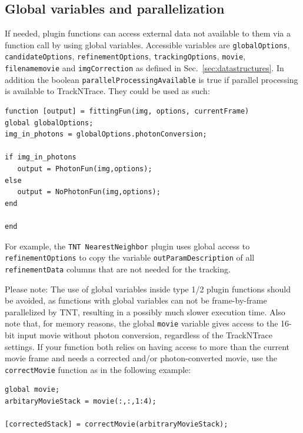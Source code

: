 \documentclass[11pt,onside]{report}
\numberwithin{equation}{chapter}
\begin{document}
\subsection{Global variables and parallelization}
If needed, plugin functions can access external data not available to them via a function call by using global variables. Accessible variables are  \texttt{globalOptions}, \texttt{candidateOptions}, \texttt{refinementOptions}, \texttt{trackingOptions}, \texttt{movie}, \texttt{filename\textunderscore movie} and \texttt{imgCorrection} as defined in Sec.~\ref{sec:datastructures}. In addition the boolean \texttt{parallelProcessingAvailable} is true if parallel processing is available to TrackNTrace. They could be used as such:
\begin{lstlisting}[style=Matlab-editor]
function [output] = fittingFun(img, options, currentFrame)
global globalOptions;
img_in_photons = globalOptions.photonConversion;

if img_in_photons
   output = PhotonFun(img,options);
else
   output = NoPhotonFun(img,options);
end

end
\end{lstlisting}
For example, the \texttt{TNT NearestNeighbor} plugin uses global access to \texttt{refinementOptions} to copy the variable \texttt{outParamDescription} of all \texttt{refinementData} columns that are not needed for the tracking. 

Please note: The use of global variables inside type 1/2 plugin functions should be avoided, as functions with global variables can not be frame-by-frame parallelized by TNT, resulting in a possibly much slower execution time. Also note that, for memory reasons, the global \texttt{movie} variable gives access to the 16-bit input movie without photon conversion, regardless of the TrackNTrace settings. If your function both relies on having access to more than the current movie frame and needs a corrected and/or photon-converted movie, use the \texttt{correctMovie} function as in the following example:
\begin{lstlisting}[style=Matlab-editor]
global movie;
arbitaryMovieStack = movie(:,:,1:4);

[correctedStack] = correctMovie(arbitraryMovieStack);
\end{lstlisting}

\clearpage
\end{document}
